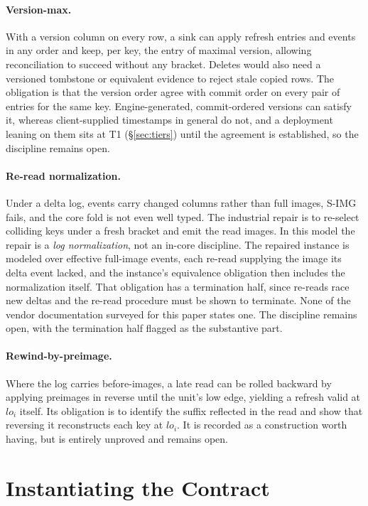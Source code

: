 \documentclass[sigconf,nonacm,10pt]{acmart}
\theoremstyle{plain}
\theoremstyle{definition}
\begin{document}
\paragraph{Version-max.}
With a version column on every row, a sink can apply refresh
entries and events in any order and keep, per key, the entry of
maximal version, allowing reconciliation to succeed without any bracket. 
Deletes would also need a versioned tombstone or equivalent 
evidence to reject stale copied rows. The obligation is that 
the version order agree with commit order on
every pair of entries for the same key. Engine-generated,
commit-ordered versions can satisfy it, whereas client-supplied
timestamps in general do not, and a deployment leaning on them
sits at T1 (\S\ref{sec:tiers}) until the agreement is
established, so the discipline remains open.

\paragraph{Re-read normalization.}
Under a delta log, events carry changed columns rather than full
images, S-IMG fails, and the core fold is not even well typed.
The industrial repair is to re-select colliding keys under a fresh
bracket and emit the read images. In this model the repair is a
\emph{log normalization}, not an in-core discipline. The repaired
instance is modeled over effective full-image events, each re-read
supplying the image its delta event lacked, and the instance's
equivalence obligation then includes the normalization itself.
That obligation has a termination half, since re-reads race new
deltas and the re-read procedure must be shown to terminate. None of the
vendor documentation surveyed for this paper states one. The discipline
remains open, with the termination half flagged as the substantive part.

\paragraph{Rewind-by-preimage.}
Where the log carries before-images, a late read can be rolled
backward by applying preimages in reverse until the unit's low edge,
yielding a refresh valid at $lo_i$ itself. Its obligation is to 
identify the suffix reflected in the read and 
show that reversing it reconstructs each key at $lo_i$. It is 
recorded as a construction worth having,
but is entirely unproved and remains open.

\section{Instantiating the Contract}\label{sec:instances}
\end{document}
